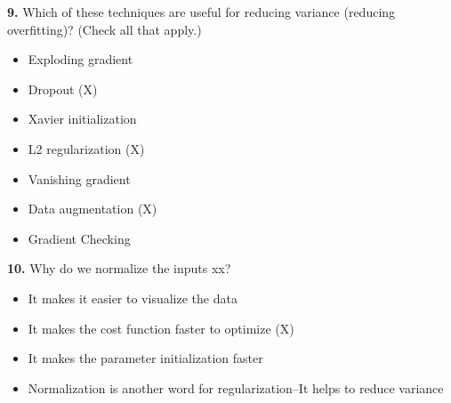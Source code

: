 \textbf{9.} Which of these techniques are useful for reducing variance (reducing overfitting)? (Check all that apply.)
\begin{itemize}
    \item Exploding gradient
    \item Dropout (X)
    \item Xavier initialization
    \item L2 regularization (X)
    \item Vanishing gradient
    \item Data augmentation (X)
    \item Gradient Checking
\end{itemize}
\textbf{10.} Why do we normalize the inputs xx?
\begin{itemize}
    \item It makes it easier to visualize the data
    \item It makes the cost function faster to optimize (X)
    \item It makes the parameter initialization faster
    \item Normalization is another word for regularization--It helps to reduce variance
\end{itemize}